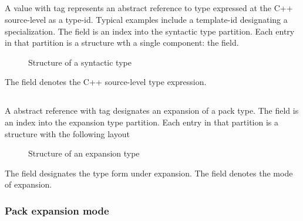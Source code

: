 
\subsection{}
\label{sec:ifc:TypeSort:Syntactic}

A  value with tag  represents
an abstract reference to type expressed at the C++ source-level as a type-id.
Typical examples include a template-id designating a specialization.
The  field is an index into the syntactic type partition.
Each entry in that partition is a structure wth a single component: the  field.
%
\begin{figure}[H]
	\centering
	\caption{Structure of a syntactic type}
	\label{fig:ifc-syntactic-type-structure}
\end{figure}
%
The  field denotes the C++ source-level type expression.


\subsection{}
\label{sec:ifc:TypeSort:Expansion}

A  abstract reference with tag  designates
an expansion of a pack type.  The  field is an index into the expansion
type partition.  Each entry in that partition is a structure with the following layout
%
\begin{figure}[H]
	\centering
	\caption{Structure of an expansion type}
	\label{fig:fic-expansion-type-structure}
\end{figure}
%
The  field designates the type form under expansion.
The  field denotes the mode of expansion.


\subsubsection{Pack expansion mode}
\label{sec:ifc-pack-expansion-mode}

